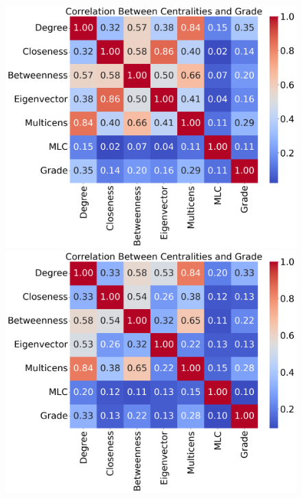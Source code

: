 \documentclass[10pt,letterpaper]{article}
\begin{document}
\begin{figure}[h!]
\begin{minipage}[b]{0.28\linewidth}
	\centering
	\includegraphics[width=\textwidth]{figs/fig31-hif2a_arnt-corr.png}
	\subcaption{}
\end{minipage}
\hspace{0.5cm}
\begin{minipage}[b]{0.28\linewidth}
	\centering
	\includegraphics[width=\textwidth]{figs/fig32-hif3a_arnt-corr.png}
	\subcaption{}
\end{minipage}
\hspace{0.5cm}

\end{figure}
\end{document}
